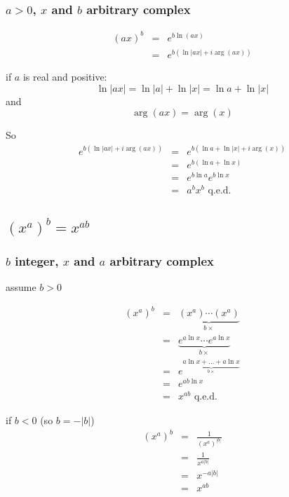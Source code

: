 \documentclass{article}
\begin{document}
\subsubsection{$a>0$, $x$ and $b$ arbitrary complex}

\begin{eqnarray}
(ax)^b & = & e^{b \ln(ax)}
\nonumber\\
& = & e^{b (\ln |ax| + i \arg(ax))}
\end{eqnarray}

if $a$ is real and positive:
\begin{equation}
\ln |ax| = \ln |a| + \ln |x| = \ln a + \ln |x|
\end{equation}
and 
\begin{equation}
\arg(ax) = \arg(x)
\end{equation}

So
\begin{eqnarray}
e^{b (\ln |ax| + i \arg(ax))} & = &
e^{b (\ln a + \ln |x| + i \arg(x))}
\nonumber\\
& = & e^{b (\ln a + \ln x)}
\nonumber\\
& = & e^{b \ln a} e^{b \ln x}
\nonumber\\
& = & a^b x^b \mbox{ q.e.d.}
\end{eqnarray}

\subsection{$(x^a)^b = x^{ab}$}

\subsubsection{$b$ integer, $x$ and $a$ arbitrary complex}

assume $b>0$

\begin{eqnarray}
(x^a)^b & = & \underbrace{(x^a) \cdots (x^a)}_{b \times}
\nonumber\\
& = & \underbrace{e^{a \ln x} \cdots e^{a \ln x}}_{b \times}
\nonumber\\
& = & e^{\underbrace{\scriptstyle a \ln x + \dots + a \ln x}_{b \times}}
\nonumber\\
& = & e^{a b \ln x}
\nonumber\\
& = & x^{ab} \mbox{ q.e.d.}
\end{eqnarray}

if $b<0$ (so $b=-|b|$)
\begin{eqnarray}
(x^a)^b & = & \frac{1}{(x^a)^{|b|}}
\nonumber\\
& = & \frac{1}{x^{a|b|}}
\nonumber\\
& = & x^{-a|b|}
\nonumber\\
& = & x^{ab}
\end{eqnarray}
\end{document}
